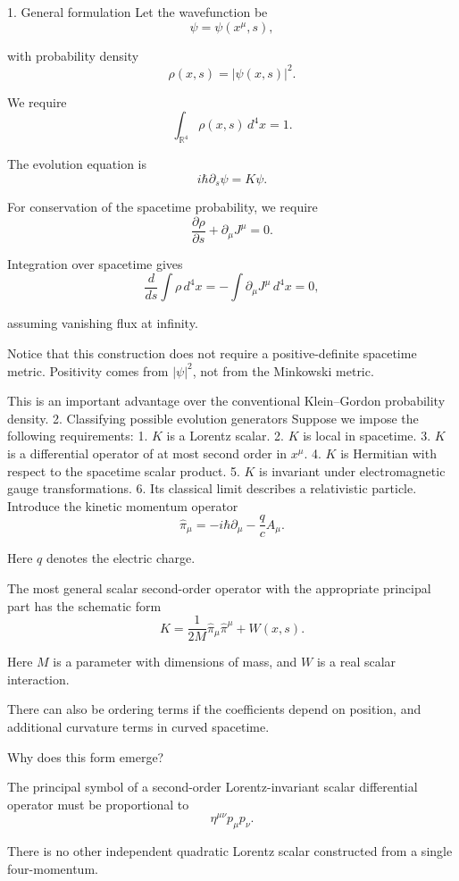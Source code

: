 1. General formulation
Let the wavefunction be
\[
\psi=\psi(x^\mu,s),
\]

with probability density
\[
\rho(x,s)=|\psi(x,s)|^2.
\]

We require
\[
\int_{\mathbb R^4}\rho(x,s)\,d^4x=1.
\tag{1}
\]

The evolution equation is
\[
i\hbar\partial_s\psi=K\psi.
\tag{2}
\]

For conservation of the spacetime probability, we require
\[
\frac{\partial\rho}{\partial s}
+\partial_\mu J^\mu=0.
\tag{3}
\]

Integration over spacetime gives
\[
\frac{d}{ds}\int\rho\,d^4x
=
-\int\partial_\mu J^\mu\,d^4x=0,
\]

assuming vanishing flux at infinity.

Notice that this construction does not require a positive-definite spacetime metric. Positivity comes from \(|\psi|^2\), not from the Minkowski metric.

This is an important advantage over the conventional Klein–Gordon probability density.
2. Classifying possible evolution generators
Suppose we impose the following requirements:
1. \(K\) is a Lorentz scalar.
2. \(K\) is local in spacetime.
3. \(K\) is a differential operator of at most second order in \(x^\mu\).
4. \(K\) is Hermitian with respect to the spacetime scalar product.
5. \(K\) is invariant under electromagnetic gauge transformations.
6. Its classical limit describes a relativistic particle.
Introduce the kinetic momentum operator
\[
\hat\pi_\mu
=
-i\hbar\partial_\mu-\frac qc A_\mu.
\tag{4}
\]

Here \(q\) denotes the electric charge.

The most general scalar second-order operator with the appropriate principal part has the schematic form
\[
\boxed{
K=
\frac{1}{2M}\hat\pi_\mu\hat\pi^\mu
+W(x,s).
}
\tag{5}
\]

Here \(M\) is a parameter with dimensions of mass, and \(W\) is a real scalar interaction.

There can also be ordering terms if the coefficients depend on position, and additional curvature terms in curved spacetime.

Why does this form emerge?

The principal symbol of a second-order Lorentz-invariant scalar differential operator must be proportional to
\[
\eta^{\mu\nu}p_\mu p_\nu.
\]

There is no other independent quadratic Lorentz scalar constructed from a single four-momentum.

